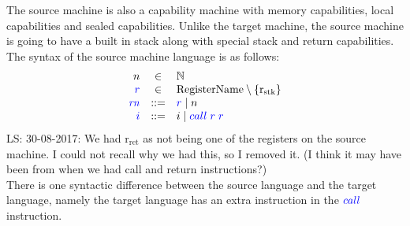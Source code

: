 \documentclass[a4paper]{article}
\newcommand\lau[1]{{\color{purple} \sf \footnotesize {LS: #1}}\\}
\newcommand{\defbnf}{::=}
\newcommand{\sourcecolor}[1]{\color{blue}}
\newcommand{\src}[1]{{\sourcecolor{} #1}}
\newcommand{\targetcolor}[1]{\color{black}}
\newcommand{\trg}[1]{{\targetcolor{} #1}}
\newcommand{\zinstr}[1]{#1}
\newcommand{\twoinstr}[3]{
  \ifthenelse{\equal{#2#3}{}}
  {\zinstr{#1}}
  {\zinstr{#1} \; #2 \; #3}
}
\newcommand{\scall}[2]{\twoinstr{\src{call}}{#1}{#2}}
\newcommand{\nats}{\mathbb{N}}
\newcommand{\shareddom}[1]{\mathrm{#1}}
\newcommand{\RegName}{\shareddom{RegisterName}}
\newcommand{\var}[1]{\mathit{#1}}
\newcommand{\rn}{\var{rn}}
\newcommand{\rstk}{\mathrm{r}_\mathrm{stk}}
\newcommand{\rO}{\mathrm{r}_\mathrm{ret}}
\newcommand{\rret}{\rO}
\begin{document}
The source machine is also a capability machine with memory capabilities, local capabilities and sealed capabilities. Unlike the target machine, the source machine is going to have a built in stack along with special stack and return capabilities. The syntax of the source machine language is as follows:
\[
  \begin{array}{rcl}
    n & \in & \nats \\
    \src{r} &\in &  \RegName \setminus \{\rstk\}\\
    \src{\rn} &\defbnf & \src{r} \mid n \\
    \src{i} & \defbnf &  \trg{i} \mid \scall{\src{r}}{\src{r}}
  \end{array}
\]
\lau{30-08-2017: We had $\rret$ as not being one of the registers on the source machine. I could not recall why we had this, so I removed it. (I think it may have been from when we had call and return instructions?)}
There is one syntactic difference between the source language and the target language, namely the target language has an extra instruction in the $\scall{}{}$ instruction.
\end{document}
